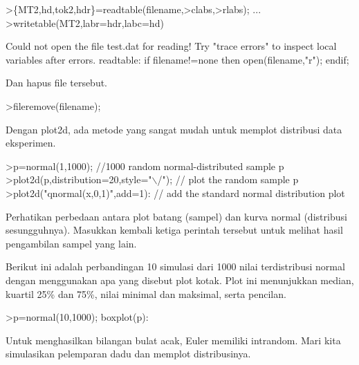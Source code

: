 \documentclass[a4paper,10pt]{article}
\begin{document}
\begin{eulernotebook}
\begin{eulercomment}
\begin{eulercomment}
\begin{eulercomment}
\begin{eulercomment}
\begin{eulercomment}
\begin{eulercomment}
\begin{eulercomment}
\begin{eulercomment}
\begin{eulercomment}
\begin{eulercomment}
\begin{eulercomment}
\begin{eulercomment}
\begin{eulercomment}
\begin{eulercomment}
\begin{eulercomment}
\begin{eulercomment}
\begin{eulercomment}
\begin{eulercomment}
\begin{eulerprompt}
>\{MT2,hd,tok2,hdr\}=readtable(filename,>clabs,>rlabs); ...
>writetable(MT2,labr=hdr,labc=hd)
\end{eulerprompt}
\begin{euleroutput}
  Could not open the file
  test.dat
  for reading!
  Try "trace errors" to inspect local variables after errors.
  readtable:
      if filename!=none then open(filename,"r"); endif;
\end{euleroutput}
\begin{eulercomment}
Dan hapus file tersebut.
\end{eulercomment}
\begin{eulerprompt}
>fileremove(filename);
\end{eulerprompt}
\begin{eulercomment}
Dengan plot2d, ada metode yang sangat mudah untuk memplot distribusi
data eksperimen.
\end{eulercomment}
\begin{eulerprompt}
>p=normal(1,1000); //1000 random normal-distributed sample p
>plot2d(p,distribution=20,style="\(\backslash\)/"); // plot the random sample p
>plot2d("qnormal(x,0,1)",add=1): // add the standard normal distribution plot
\end{eulerprompt}
\begin{eulercomment}
Perhatikan perbedaan antara plot batang (sampel) dan kurva normal
(distribusi sesungguhnya). Masukkan kembali ketiga perintah tersebut
untuk melihat hasil pengambilan sampel yang lain.
\end{eulercomment}
\begin{eulercomment}
Berikut ini adalah perbandingan 10 simulasi dari 1000 nilai
terdistribusi normal dengan menggunakan apa yang disebut plot kotak.
Plot ini menunjukkan median, kuartil 25\% dan 75\%, nilai minimal dan
maksimal, serta pencilan.
\end{eulercomment}
\begin{eulerprompt}
>p=normal(10,1000); boxplot(p):
\end{eulerprompt}
\begin{eulercomment}
Untuk menghasilkan bilangan bulat acak, Euler memiliki intrandom. Mari
kita simulasikan pelemparan dadu dan memplot distribusinya.


\end{eulercomment}
\end{eulercomment}
\end{eulercomment}
\end{eulercomment}
\end{eulercomment}
\end{eulercomment}
\end{eulercomment}
\end{eulercomment}
\end{eulercomment}
\end{eulercomment}
\end{eulercomment}
\end{eulercomment}
\end{eulercomment}
\end{eulercomment}
\end{eulercomment}
\end{eulercomment}
\end{eulercomment}
\end{eulercomment}
\end{eulercomment}
\end{eulernotebook}
\end{document}
